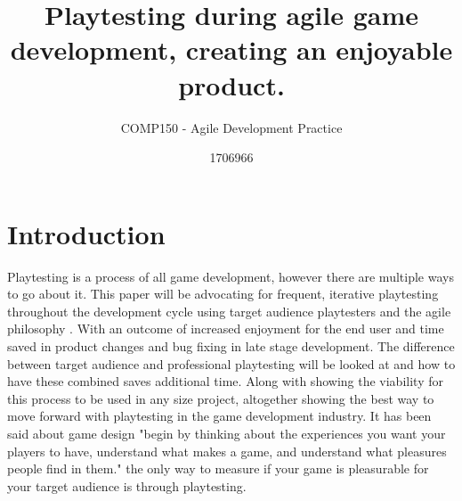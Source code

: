 \documentclass{scrartcl}
\title{Playtesting during agile game development, creating an enjoyable product.}
\subtitle{COMP150 - Agile Development Practice}
\author{1706966}
\begin{document}
	
	\maketitle
	
	
	\section{Introduction}
	
	Playtesting is a process of all game development, however there are multiple ways to go about it. This paper will be advocating for frequent, iterative playtesting throughout the development cycle using target audience playtesters and the agile philosophy \cite{fowler2001agile}. With an outcome of increased enjoyment for the end user and time saved in product changes and bug fixing in late stage development. The difference between target audience and professional playtesting will be looked at and how to have these combined saves additional time. Along with showing the viability for this process to be used in any size project, altogether showing the best way to move forward with playtesting in the game development industry. It has been said about game design "begin by thinking about the experiences you want your players to have, understand what makes a game, and understand what pleasures people find in them." \cite[p.33]{costikyan2005have} the only way to measure if your game is pleasurable for your target audience is through playtesting.
	
\end{document}
